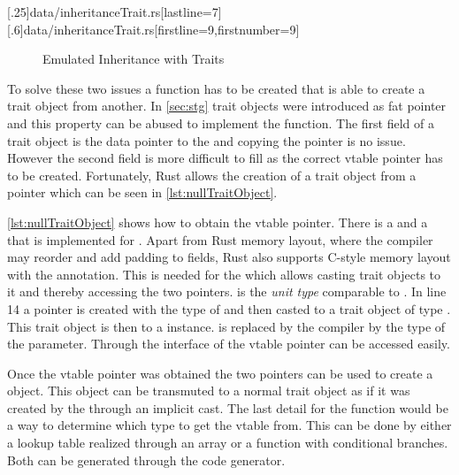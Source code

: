 \documentclass[thesis]{subfiles}
\begin{document}
    \LstTikzBox{\inheritanceTraitOne}[.25\linewidth]{data/inheritanceTrait.rs}[lastline=7]
    \LstTikzBox{\inheritanceTraitTwo}[.6\linewidth]{data/inheritanceTrait.rs}[firstline=9,firstnumber=9]
    \begin{figure}[ht]
      \captionsetup{type=lstlisting}
      \usebox{\inheritanceTraitOne}\hfill%
      \usebox{\inheritanceTraitTwo}
      \caption{Emulated Inheritance with Traits}\label{lst:inheritanceTrait}
    \end{figure}

    To solve these two issues a \cast function has to be created that is able to create a trait object from another.
    In \autoref{sec:stg} trait objects were introduced as fat pointer and this property can be abused to implement the \cast function.
    The first field of a trait object is the data pointer to the \struct and copying the pointer is no issue.
    However the second field is more difficult to fill as the correct vtable pointer has to be created.
    Fortunately, Rust allows the creation of a trait object from a  pointer which can be seen in \autoref{lst:nullTraitObject}\autocite[2.2. Exotically Sized Types]{rust-nom}.%
    ~\autocite{rust-digg}


    \autoref{lst:nullTraitObject} shows how to obtain the vtable pointer.
    There is a  and a  that is implemented for .
    Apart from Rust memory layout, where the compiler may reorder and add padding to fields, Rust also supports C-style memory layout with the \codr{#[repr(C)]} annotation.
    This is needed for the \TraitObject \struct which allows casting trait objects to it and thereby accessing the two pointers.
    \codr{()} is the \emph{unit type} comparable to \autocites[repr(C)]{rust-nom}[Defining and Instantiating Structs]{rust-book}.
    In line 14 a  pointer is created with the type of  and then casted to a trait object of type .
    This trait object is then  to a \TraitObject instance.
    \codr{_} is replaced by the compiler by the type of the parameter.
    Through the interface of \TraitObject the vtable pointer can be accessed easily.

    Once the vtable pointer was obtained the two pointers can be used to create a \TraitObject object.
    This object can be transmuted to a normal trait object as if it was created by the \struct through an implicit cast.
    The last detail for the \cast function would be a way to determine which type to get the vtable from.
    This can be done by either a lookup table realized through an array or a function with conditional branches.
    Both can be generated through the code generator.
\end{document}
